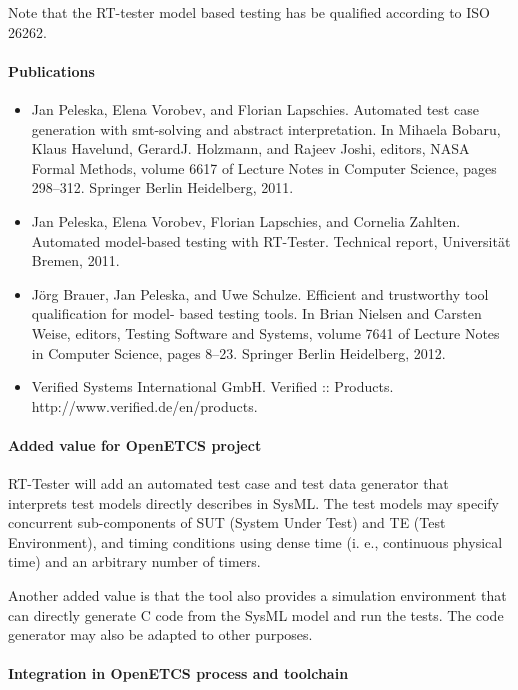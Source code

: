 Note that the RT-tester model based testing has be qualified according
to ISO 26262.

\paragraph{Publications}

\begin{itemize}
\item Jan Peleska, Elena Vorobev, and Florian Lapschies. Automated test case generation with smt-solving
and abstract interpretation. In Mihaela Bobaru, Klaus Havelund, GerardJ. Holzmann, and Rajeev
Joshi, editors, NASA Formal Methods, volume 6617 of Lecture Notes in Computer Science, pages
298–312. Springer Berlin Heidelberg, 2011.
\item Jan Peleska, Elena Vorobev, Florian Lapschies, and Cornelia Zahlten. Automated model-based
testing with RT-Tester. Technical report, Universität Bremen, 2011.
\item Jörg Brauer, Jan Peleska, and Uwe Schulze. Efficient and trustworthy tool qualification for model-
based testing tools. In Brian Nielsen and Carsten Weise, editors, Testing Software and Systems,
volume 7641 of Lecture Notes in Computer Science, pages 8–23. Springer Berlin Heidelberg, 2012.
\item Verified Systems International GmbH. Verified :: Products. http://www.verified.de/en/products.


\end{itemize} 

\paragraph{Added value for OpenETCS project}

RT-Tester will add  an automated test case and test data generator
that interprets test models directly describes in SysML. 
The test models may specify concurrent sub-components of
SUT (System Under Test) and TE (Test Environment), and timing
conditions using dense time (i. e., continuous physical time) and 
an arbitrary number of timers. 

Another added value is that the tool also provides a simulation
environment that can directly generate C code from the SysML model and
run the tests.
The code generator may also be adapted to other purposes.

\paragraph{Integration in OpenETCS process and toolchain}

